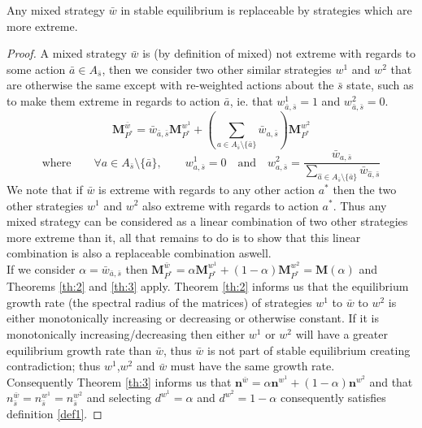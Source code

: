 \begin{Lemma}\label{lemma:part1}
Any mixed strategy $\bar{w}$ in stable equilibrium is replaceable by strategies which are more extreme.
\end{Lemma}
\begin{proof}
A mixed strategy $\bar{w}$ is (by definition of mixed) not extreme with regards to some action $\bar{a}\in A_{\bar{s}}$, then we consider two other similar strategies $w^1$ and $w^2$ that are otherwise the same except with re-weighted actions about the $\bar{s}$ state, such as to make them extreme in regards to action $\bar{a}$, ie. that $w^1_{\bar{a},\bar{s}}=1$ and $w^2_{\bar{a},\bar{s}}=0$.
$$ \mathbf{M}_{P^*}^{\bar{w}} = \bar{w}_{\bar{a},\bar{s}}\mathbf{M}_{P^*}^{w^1} + \left(\sum_{a\in A_{\bar{s}}\setminus \{\bar{a}\}} \bar{w}_{a,\bar{s}}\right)\mathbf{M}_{P^*}^{w^2} $$
$$\text{where}\qquad \forall a\in A_{\bar{s}}\setminus \{\bar{a}\},\qquad  w^1_{a,\bar{s}}=0 \quad\text{and}\quad w^2_{a,\bar{s}} = \frac{\bar{w}_{a,\bar{s}}}{\sum_{\hat{a}\in A_{\bar{s}}\setminus \{\bar{a}\}} \bar{w}_{\hat{a},\bar{s}}} $$
We note that if $\bar{w}$ is extreme with regards to any other action $a^*$ then the two other strategies $w^1$ and $w^2$ also extreme with regards to action $a^*$.
Thus any mixed strategy can be considered as a linear combination of two other strategies more extreme than it, all that remains to do is to show that this linear combination is also a replaceable combination aswell.\\
If we consider $\alpha = \bar{w}_{\bar{a},\bar{s}}$ then $\mathbf{M}_{P^*}^{\bar{w}} = \alpha\mathbf{M}_{P^*}^{w^1} + (1-\alpha)\mathbf{M}_{P^*}^{w^2} = \mathbf{M}(\alpha)$ and Theorems \ref{th:2} and \ref{th:3} apply.
Theorem \ref{th:2} informs us that the equilibrium growth rate (the spectral radius of the matrices) of strategies $w^1$ to $\bar{w}$ to $w^2$ is either monotonically increasing or decreasing or otherwise constant.
If it is monotonically increasing/decreasing then either $w^1$ or $w^2$ will have a greater equilibrium growth rate than $\bar{w}$, thus $\bar{w}$ is not part of stable equilibrium creating contradiction; thus $w^1$,$w^2$ and $\bar{w}$ must have the same growth rate.\\
Consequently Theorem \ref{th:3} informs us that $\mathbf{n}^{\bar{w}} = \alpha \mathbf{n}^{w^1} + (1-\alpha)\mathbf{n}^{w^2}$ and that $n^{\bar{w}}_{\bar{s}} = n^{w^1}_{\bar{s}} = n^{w^2}_{\bar{s}}$ and selecting $d^{w^1} = \alpha$ and $d^{w^2} = 1-\alpha$ consequently satisfies definition \ref{def1}.
\end{proof}


